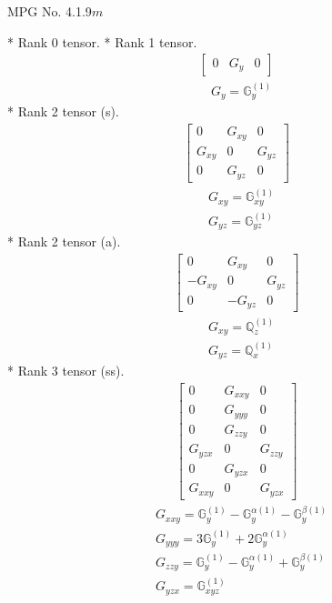 \documentclass[fleqn,8pt,landscape]{jsarticle}
\begin{document}
\setcounter{MaxMatrixCols}{32}

\renewcommand{\tablename}{Table~}
\renewcommand{\figurename}{Figure~}
\begin{center}
\LARGE
MPG No. 4.1.9\quad$m$
\end{center}
* Rank 0 tensor.
* Rank 1 tensor.
\begin{align*}
\begin{bmatrix} 0 & G_{y} & 0 \end{bmatrix}
\end{align*}
\begin{align*}
& G_{y} = \mathbb{G}_{y}^{(1)}
\end{align*}
* Rank 2 tensor (s).
\begin{align*}
\begin{bmatrix} 0 & G_{xy} & 0 \\ G_{xy} & 0 & G_{yz} \\ 0 & G_{yz} & 0 \end{bmatrix}
\end{align*}
\begin{align*}
& G_{xy} = \mathbb{G}_{xy}^{(1)} \\
& G_{yz} = \mathbb{G}_{yz}^{(1)}
\end{align*}
* Rank 2 tensor (a).
\begin{align*}
\begin{bmatrix} 0 & G_{xy} & 0 \\ - G_{xy} & 0 & G_{yz} \\ 0 & - G_{yz} & 0 \end{bmatrix}
\end{align*}
\begin{align*}
& G_{xy} = \mathbb{Q}_{z}^{(1)} \\
& G_{yz} = \mathbb{Q}_{x}^{(1)}
\end{align*}
* Rank 3 tensor (ss).
\begin{align*}
\begin{bmatrix} 0 & G_{xxy} & 0 \\ 0 & G_{yyy} & 0 \\ 0 & G_{zzy} & 0 \\ G_{yzx} & 0 & G_{zzy} \\ 0 & G_{yzx} & 0 \\ G_{xxy} & 0 & G_{yzx} \end{bmatrix}
\end{align*}
\begin{align*}
& G_{xxy} = \mathbb{G}_{y}^{(1)} - \mathbb{G}_{y}^{\alpha(1)} - \mathbb{G}_{y}^{\beta(1)} \\
& G_{yyy} = 3 \mathbb{G}_{y}^{(1)} + 2 \mathbb{G}_{y}^{\alpha(1)} \\
& G_{zzy} = \mathbb{G}_{y}^{(1)} - \mathbb{G}_{y}^{\alpha(1)} + \mathbb{G}_{y}^{\beta(1)} \\
& G_{yzx} = \mathbb{G}_{xyz}^{(1)}
\end{align*}
\end{document}
